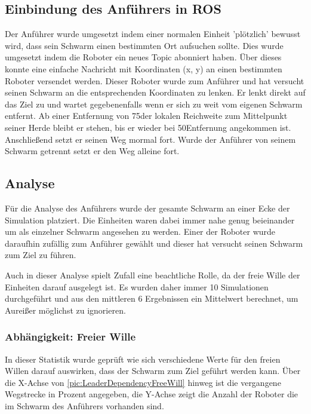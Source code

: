 \subsection*{Einbindung des Anführers in ROS}

Der Anführer wurde umgesetzt indem einer normalen Einheit 'plötzlich' bewusst wird, dass sein Schwarm einen bestimmten Ort aufsuchen sollte. Dies wurde umgesetzt indem die Roboter ein neues Topic abonniert haben. Über dieses konnte eine einfache Nachricht mit Koordinaten (x, y) an einen bestimmten Roboter versendet werden. Dieser Roboter wurde zum Anführer und hat versucht seinen Schwarm an die entsprechenden Koordinaten zu lenken. Er lenkt direkt auf das Ziel zu und wartet gegebenenfalls wenn er sich zu weit vom eigenen Schwarm entfernt. Ab einer Entfernung von 75\per der lokalen Reichweite zum Mittelpunkt seiner Herde bleibt er stehen, bis er wieder bei 50\per Entfernung angekommen ist. Anschließend setzt er seinen Weg mormal fort. Wurde der Anführer von seinem Schwarm getrennt setzt er den Weg alleine fort.

\subsection*{Analyse}

Für die Analyse des Anführers wurde der gesamte Schwarm an einer Ecke der Simulation platziert. Die Einheiten waren dabei immer nahe genug beieinander um als einzelner Schwarm angesehen zu werden. Einer der Roboter wurde daraufhin zufällig zum Anführer gewählt und dieser hat versucht seinen Schwarm zum Ziel zu führen.

Auch in dieser Analyse spielt Zufall eine beachtliche Rolle, da der freie Wille der Einheiten darauf ausgelegt ist. Es wurden daher immer 10 Simulationen durchgeführt und aus den mittleren 6 Ergebnissen ein Mittelwert berechnet, um Aureißer möglichst zu ignorieren.

\subsubsection*{Abhängigkeit: Freier Wille}\label{subsubsec:AbhängigkeitFreierWille}

In dieser Statistik wurde geprüft wie sich verschiedene Werte für den freien Willen darauf auswirken, dass der Schwarm zum Ziel geführt werden kann. Über die X-Achse von \autoref{pic:LeaderDependencyFreeWill} hinweg ist die vergangene Wegstrecke in Prozent angegeben, die Y-Achse zeigt die Anzahl der Roboter die im Schwarm des Anführers vorhanden sind.

